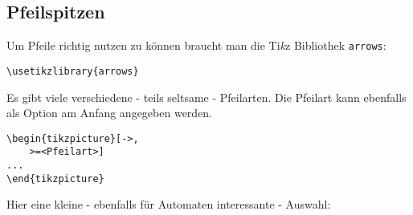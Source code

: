 \documentclass{article}
\newcommand{\logo}{Ti\textit{k}z }
\begin{document}
	\subsection{Pfeilspitzen}
		Um Pfeile richtig nutzen zu können braucht man die \logo Bibliothek \texttt{arrows}:\\
		\begin{minipage}{\linewidth}
			\begin{lstlisting}[caption={Die Bibliothek \texttt{arrows} wird zum Pfeile zeichnen benötigt.}]
\usetikzlibrary{arrows}
			\end{lstlisting}
		\end{minipage}
		Es gibt viele verschiedene - teils seltsame - Pfeilarten. 
		Die Pfeilart kann ebenfalls als Option am Anfang angegeben werden.\\
		\begin{minipage}{\linewidth}
			\begin{lstlisting}[caption={Angabe einer Pfeilart.}]
\begin{tikzpicture}[->,
	>=<Pfeilart>]
...
\end{tikzpicture}
			\end{lstlisting}
		\end{minipage}
		Hier eine kleine - ebenfalls für Automaten interessante - Auswahl:
\end{document}
